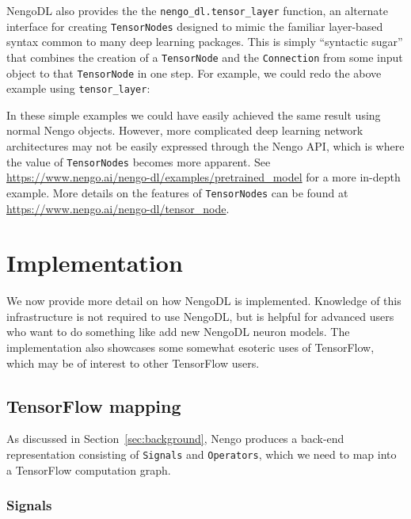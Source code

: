 \documentclass{article}
\begin{document}
NengoDL also provides the the \texttt{nengo\_dl.tensor\_layer} function, an alternate interface for creating \texttt{TensorNodes} designed to mimic the familiar layer-based syntax common to many deep learning packages.  This is simply ``syntactic sugar'' that combines the creation of a \texttt{TensorNode} and the \texttt{Connection} from some input object to that \texttt{TensorNode} in one step.  For example, we could redo the above example using \texttt{tensor\_layer}:



In these simple examples we could have easily achieved the same result using normal Nengo objects.  However, more complicated deep learning network architectures may not be easily expressed through the Nengo API, which is where the value of \texttt{TensorNodes} becomes more apparent.  See \url{https://www.nengo.ai/nengo-dl/examples/pretrained_model} for a more in-depth example.  More details on the features of \texttt{TensorNodes} can be found at \url{https://www.nengo.ai/nengo-dl/tensor_node}.

\section{Implementation}
\label{sec:implementation}

We now provide more detail on how NengoDL is implemented.  Knowledge of this infrastructure is not required to use NengoDL, but is helpful for advanced users who want to do something like add new NengoDL neuron models.  The implementation also showcases some somewhat esoteric uses of TensorFlow, which may be of interest to other TensorFlow users.

\subsection{TensorFlow mapping}

As discussed in Section~\ref{sec:background}, Nengo produces a back-end representation consisting of \texttt{Signals} and \texttt{Operators}, which we need to map into a TensorFlow computation graph.

\subsubsection{Signals}
\end{document}
